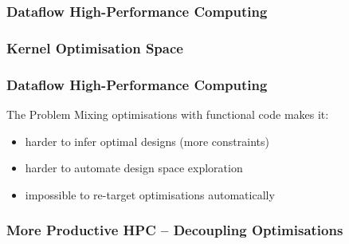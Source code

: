 \begin{frame}
  \frametitle{Dataflow High-Performance Computing}
  \begin{figure}[!ht]
    \centering
    \def\svgwidth{0.9\linewidth}
    
  \end{figure}
\end{frame}

\begin{frame}[fragile]
  \frametitle{Kernel Optimisation Space}
  \begin{figure}[!ht]
    \centering
    \def\svgwidth{\linewidth}
    
  \end{figure}
\end{frame}

\begin{frame}[fragile]
  \frametitle{Dataflow High-Performance Computing}
  \begin{beamerboxesrounded}{The Problem}
    Mixing optimisations with functional code makes it:
    \begin{itemize}
    \setlength{\itemsep}{10pt}
    \item harder to infer optimal designs (more constraints)
    \item harder to automate design space exploration
    \item impossible to re-target optimisations automatically
    \end{itemize}
  \end{beamerboxesrounded}
\end{frame}


\begin{frame}[fragile]
  \frametitle{More Productive HPC -- Decoupling Optimisations}
  \begin{figure}[!ht]
    \centering
    \def\svgwidth{\textwidth}
    
  \end{figure}
\end{frame}
